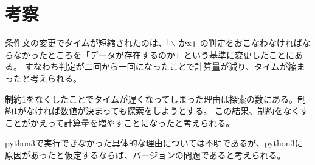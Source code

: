 \documentclass[a4paper,titlepage,11pt]{ltjsarticle}
\begin{document}
\section{考察}
条件文の変更でタイムが短縮されたのは、「$\backslash$ かx」の判定をおこなわなければならなかったところを「データが存在するのか」という基準に変更したことにある。
すなわち判定が二回から一回になったことで計算量が減り、タイムが縮まったと考えられる。

制約1をなくしたことでタイムが遅くなってしまった理由は探索の数にある。制約1がなければ数値が決まっても探索をしようとする。
この結果、制約をなくすことがかえって計算量を増やすことになったと考えられる。

python3で実行できなかった具体的な理由については不明であるが、python3に原因があったと仮定するならば、バージョンの問題であると考えられる。
\end{document}
